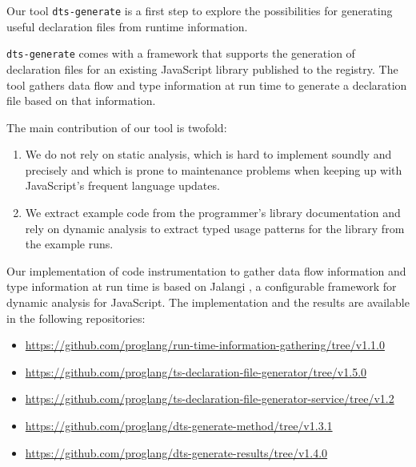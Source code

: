 \documentclass[sigconf]{acmart}
\begin{document}
Our tool \texttt{dts-generate} is a first step to explore the possibilities for
generating useful declaration files from runtime information.

\texttt{dts-generate} comes with a framework that 
supports the generation of declaration files for an existing
JavaScript library published to the \NPM{} registry. The tool gathers
data flow and type information at run time to generate a declaration
file based on that information.

The main contribution of our tool is twofold:
\begin{enumerate}
\item
  We do not rely on static analysis, which is hard to implement
  soundly and precisely and which is prone to maintenance problems
  when keeping up with JavaScript's frequent language updates.
\item
  We extract example code from the programmer's library
  documentation and rely on dynamic analysis to extract typed usage
  patterns for the library from the example runs.
\end{enumerate}


Our implementation of code instrumentation  to gather data flow
information and type information at run time is based on
Jalangi \cite{DBLP:conf/sigsoft/SenKBG13}, a configurable
framework for dynamic analysis for JavaScript.
The implementation and the results are available in the following repositories:

\begin{itemize}\footnotesize
  \item \url{https://github.com/proglang/run-time-information-gathering/tree/v1.1.0}
  \item \url{https://github.com/proglang/ts-declaration-file-generator/tree/v1.5.0}
  \item \url{https://github.com/proglang/ts-declaration-file-generator-service/tree/v1.2}
  \item \url{https://github.com/proglang/dts-generate-method/tree/v1.3.1}
  \item \url{https://github.com/proglang/dts-generate-results/tree/v1.4.0}
\end{itemize}
\end{document}
